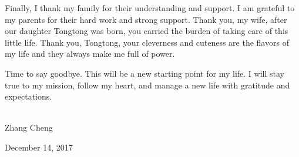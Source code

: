 \begin{ack}
Finally, I thank my family for their understanding and support. I am grateful to my parents for their hard work and strong support. Thank you, my wife, after our daughter Tongtong was born, you carried the burden of taking care of this little life. Thank you, Tongtong, your cleverness and cuteness are the flavors of my life and they always make me full of power.

Time to say goodbye. This will be a new starting point for my life. I will stay true to my mission, follow my heart, and manage a new life with gratitude and expectations.
\\
\\


\begin{flushright}
	Zhang Cheng
	
	December 14, 2017
\end{flushright}

\end{ack}
